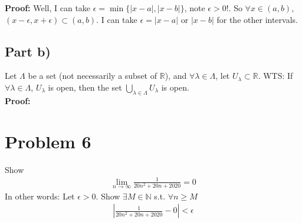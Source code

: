 \documentclass[12pt,fleqn]{article}
\numberwithin{equation}{section} %
\begin{document}
\textbf{Proof:} Well, I can take $\epsilon = \min \{|x-a|, |x-b| \}$, note $\epsilon > 0$!. So $\forall x \in (a,b)$,  $(x-\epsilon , x+\epsilon) \subset (a,b)$. I can take $\epsilon = |x-a|$ or $|x-b|$ for the other intervals.
\subsection*{Part b)}
Let $\Lambda$ be a set (not necessarily a subset of $\mathbb R$), and $\forall \lambda \in \Lambda$, let $U_\lambda \subset \mathbb R$. WTS: If $\forall \lambda \in \Lambda$, $U_\lambda$ is open, then the set $\bigcup_{\lambda \in \Lambda} U_\lambda$ is open.\\

\textbf{Proof:}


\section*{Problem 6}
Show \begin{align}
	\lim_{n\to \infty} \frac{1}{20n^2 + 20n + 2020} = 0
\end{align}
In other words: Let $\epsilon > 0$. Show $\exists M \in \mathbb N$ s.t. $\forall n \geq M$ 
\begin{align}
	\left | \frac{1}{20n^2 + 20n + 2020} - 0 \right| < \epsilon
\end{align}
\end{document}
